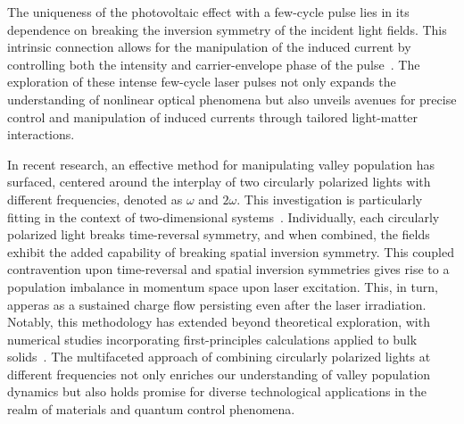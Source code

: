 The uniqueness of the photovoltaic effect with a few-cycle pulse lies in its dependence on breaking the inversion symmetry of the incident light fields. This intrinsic connection allows for the manipulation of the induced current by controlling both the intensity and carrier-envelope phase of the pulse~\cite{Schiffrin2013,Higuchi2017}. The exploration of these intense few-cycle laser pulses not only expands the understanding of nonlinear optical phenomena but also unveils avenues for precise control and manipulation of induced currents through tailored light-matter interactions.


In recent research, an effective method for manipulating valley population has surfaced, centered
around the interplay of two circularly polarized lights with different frequencies, denoted as
$\omega$ and $2\omega$. This investigation is particularly fitting in the context of
two-dimensional systems~\cite{Jimenez-Galan2020,Mrudul:21}. Individually, each circularly polarized
light breaks time-reversal symmetry, and when combined, the fields exhibit the added capability of
breaking spatial inversion symmetry. This coupled contravention upon time-reversal and spatial
inversion symmetries gives rise to a population imbalance in momentum space upon laser excitation.
This, in turn, apperas as a sustained charge flow persisting even after the laser irradiation. Notably, this methodology has extended beyond theoretical exploration, with numerical studies incorporating first-principles calculations applied to bulk solids~\cite{PhysRevLett.127.126601}. The multifaceted approach of combining circularly polarized lights at different frequencies not only enriches our understanding of valley population dynamics but also holds promise for diverse technological applications in the realm of materials and quantum control phenomena.
